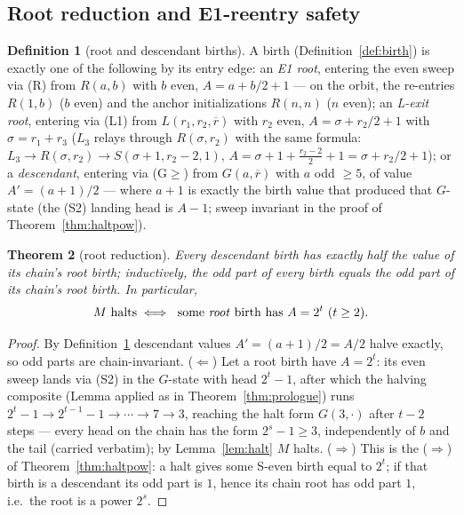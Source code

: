 \documentclass[11pt]{amsart}
\newtheorem{theorem}{Theorem}[section]
\theoremstyle{definition}
\newtheorem{definition}[theorem]{Definition}
\begin{document}
\subsection{Root reduction and E1-reentry safety}

\begin{definition}[root and descendant births]\label{def:rootbirth}
A birth (Definition~\ref{def:birth}) is exactly one of the following by its
entry edge: an \emph{E1 root}, entering the even sweep via (R) from $R(a,b)$
with $b$ even, $A=a+b/2+1$ --- on the orbit, the re-entries $R(1,b)$ ($b$ even)
and the anchor initializations $R(n,n)$ ($n$ even); an \emph{L-exit root},
entering via (L1) from $L(r_1,r_2,\overline r)$ with $r_2$ even,
$A=\sigma+r_2/2+1$ with $\sigma=r_1+r_3$ ($L_3$ relays through
$R(\sigma,r_2)$ with the same formula: $L_3\to R(\sigma,r_2)\to
S(\sigma{+}1,r_2{-}2,1)$, $A=\sigma+1+\frac{r_2-2}{2}+1=\sigma+r_2/2+1$); or a
\emph{descendant}, entering via (G$\ge$) from $G(a,\overline r)$ with $a$ odd
$\ge5$, of value $A'=(a{+}1)/2$ --- where $a{+}1$ is exactly the birth value
that produced that $G$-state (the (S2) landing head is $A-1$; sweep invariant
in the proof of Theorem~\ref{thm:haltpow}).
\end{definition}

\begin{theorem}[root reduction]\label{thm:root}
Every descendant birth has exactly half the value of its chain's root birth;
inductively, \emph{the odd part of every birth equals the odd part of its
chain's root birth}. In particular,
\[
M\ \text{halts}\iff\ \text{some \emph{root} birth has } A=2^{t}\ (t\ge2).
\]
\end{theorem}
\begin{proof}
By Definition~\ref{def:rootbirth} descendant values $A'=(a{+}1)/2=A/2$ halve
exactly, so odd parts are chain-invariant.
($\Leftarrow$) Let a root birth have $A=2^{t}$: its even sweep lands via (S2)
in the $G$-state with head $2^{t}-1$, after which the halving composite
(Lemma applied as in Theorem~\ref{thm:prologue}) runs
$2^{t}-1\to2^{t-1}-1\to\cdots\to7\to3$, reaching the halt form $G(3,\cdot)$
after $t-2$ steps --- every head on the chain has the form $2^{s}-1\ge3$,
independently of $b$ and the tail (carried verbatim); by Lemma~\ref{lem:halt}
$M$ halts.
($\Rightarrow$) This is the ($\Rightarrow$) of Theorem~\ref{thm:haltpow}: a
halt gives some S-even birth equal to $2^{t}$; if that birth is a descendant
its odd part is $1$, hence its chain root has odd part $1$, i.e.\ the root is
a power $2^{s}$.
\end{proof}
\end{document}
